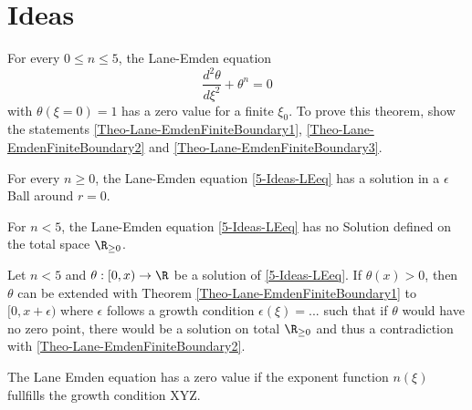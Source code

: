 \section{Ideas}
\begin{theorem}
	\label{Theo-Lane-EmdenFiniteBoundary}
	For every $0\leq n\leq5$, the Lane-Emden equation
	\begin{equation}
		\frac{d^2\theta}{d\xi^2}+\theta^n=0
		\label{5-Ideas-LEeq}
	\end{equation}
	with $\theta(\xi=0)=1$ has a zero value for a finite $\xi_0$. To prove this theorem, show the statements \ref{Theo-Lane-EmdenFiniteBoundary1}, \ref{Theo-Lane-EmdenFiniteBoundary2} and \ref{Theo-Lane-EmdenFiniteBoundary3}.
\end{theorem}
\begin{theorem}
	\label{Theo-Lane-EmdenFiniteBoundary1}
	For every $n\geq0$, the Lane-Emden equation \ref{5-Ideas-LEeq} has a solution in a $\epsilon$ Ball around $r=0$.
\end{theorem}
\begin{theorem}
	\label{Theo-Lane-EmdenFiniteBoundary2}
	For $n<5$, the Lane-Emden equation \ref{5-Ideas-LEeq} has no Solution defined on the total space $\R_{\geq0}$.
\end{theorem}
\begin{theorem}
	\label{Theo-Lane-EmdenFiniteBoundary3}
	Let $n<5$ and $\theta:[0,x)\rightarrow\R$ be a solution of \ref{5-Ideas-LEeq}. If $\theta(x)>0$, then $\theta$ can be extended with Theorem \ref{Theo-Lane-EmdenFiniteBoundary1} to $[0,x+\epsilon)$ where $\epsilon$ follows a growth condition $\epsilon(\xi)=...$ such that if $\theta$ would have no zero point, there would be a solution on total $\R_{\geq0}$ and thus a contradiction with \ref{Theo-Lane-EmdenFiniteBoundary2}.
\end{theorem}
\begin{theorem}
	The Lane Emden equation has a zero value if the exponent function $n(\xi)$ fullfills the growth condition XYZ.
\end{theorem}


